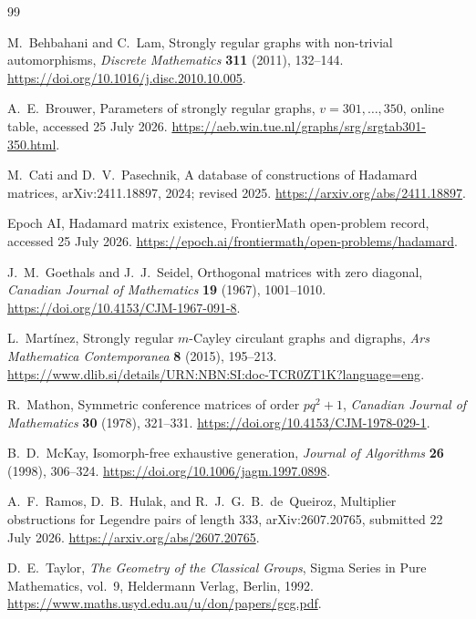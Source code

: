 \documentclass[11pt]{article}
\theoremstyle{definition}
\begin{document}
{\footnotesize
\begin{thebibliography}{99}
\setlength{\itemsep}{0.25em}

M.~Behbahani and C.~Lam,
\newblock Strongly regular graphs with non-trivial automorphisms,
\newblock \emph{Discrete Mathematics} \textbf{311} (2011), 132--144.
\newblock \url{https://doi.org/10.1016/j.disc.2010.10.005}.

A.~E.~Brouwer,
\newblock Parameters of strongly regular graphs, \(v=301,\ldots,350\),
\newblock online table, accessed 25 July 2026.
\newblock \url{https://aeb.win.tue.nl/graphs/srg/srgtab301-350.html}.

M.~Cati and D.~V.~Pasechnik,
\newblock A database of constructions of Hadamard matrices,
\newblock arXiv:2411.18897, 2024; revised 2025.
\newblock \url{https://arxiv.org/abs/2411.18897}.

Epoch AI,
\newblock Hadamard matrix existence,
\newblock FrontierMath open-problem record, accessed 25 July 2026.
\newblock \url{https://epoch.ai/frontiermath/open-problems/hadamard}.

J.~M.~Goethals and J.~J.~Seidel,
\newblock Orthogonal matrices with zero diagonal,
\newblock \emph{Canadian Journal of Mathematics} \textbf{19} (1967),
1001--1010.
\newblock \url{https://doi.org/10.4153/CJM-1967-091-8}.

L.~Mart\'inez,
\newblock Strongly regular \(m\)-Cayley circulant graphs and digraphs,
\newblock \emph{Ars Mathematica Contemporanea} \textbf{8} (2015),
195--213.
\newblock
\url{https://www.dlib.si/details/URN:NBN:SI:doc-TCR0ZT1K?language=eng}.

R.~Mathon,
\newblock Symmetric conference matrices of order \(pq^2+1\),
\newblock \emph{Canadian Journal of Mathematics} \textbf{30} (1978),
321--331.
\newblock \url{https://doi.org/10.4153/CJM-1978-029-1}.

B.~D.~McKay,
\newblock Isomorph-free exhaustive generation,
\newblock \emph{Journal of Algorithms} \textbf{26} (1998), 306--324.
\newblock \url{https://doi.org/10.1006/jagm.1997.0898}.

A.~F.~Ramos, D.~B.~Hulak, and R.~J.~G.~B.~de~Queiroz,
\newblock Multiplier obstructions for Legendre pairs of length \(333\),
\newblock arXiv:2607.20765, submitted 22 July 2026.
\newblock \url{https://arxiv.org/abs/2607.20765}.

D.~E.~Taylor,
\newblock \emph{The Geometry of the Classical Groups},
\newblock Sigma Series in Pure Mathematics, vol.~9, Heldermann Verlag,
Berlin, 1992.
\newblock \url{https://www.maths.usyd.edu.au/u/don/papers/gcg.pdf}.

\end{thebibliography}
}
\end{document}
